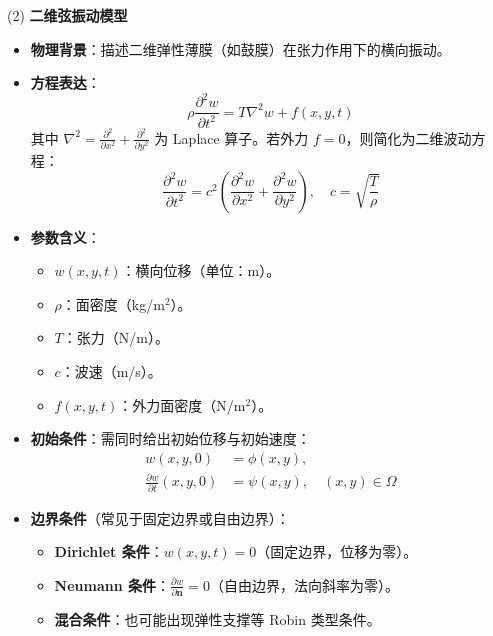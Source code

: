 \documentclass[UTF8]{article}
\begin{document}
(2) \textbf{二维弦振动模型}

\begin{itemize}[leftmargin=1.5em]
    \item \textbf{物理背景}：描述二维弹性薄膜（如鼓膜）在张力作用下的横向振动。
    \item \textbf{方程表达}：
    \begin{equation}
        \rho \frac{\partial^2 w}{\partial t^2} = T \nabla^2 w + f(x,y,t)
    \end{equation}
    其中 $\nabla^2 = \frac{\partial^2}{\partial x^2} + \frac{\partial^2}{\partial y^2}$ 为 Laplace 算子。若外力 $f=0$，则简化为二维波动方程：
    \begin{equation}
        \frac{\partial^2 w}{\partial t^2} = c^2 \left( \frac{\partial^2 w}{\partial x^2} + \frac{\partial^2 w}{\partial y^2} \right), \quad c = \sqrt{\frac{T}{\rho}}
    \end{equation}
    \item \textbf{参数含义}：
    \begin{itemize}
        \item $w(x,y,t)$：横向位移（单位：m）。
        \item $\rho$：面密度（kg/m$^2$）。
        \item $T$：张力（N/m）。
        \item $c$：波速（m/s）。
        \item $f(x,y,t)$：外力面密度（N/m$^2$）。
    \end{itemize}
    \item \textbf{初始条件}：需同时给出初始位移与初始速度：
    \begin{align}
        w(x,y,0) &= \phi(x,y), \\
        \frac{\partial w}{\partial t}(x,y,0) &= \psi(x,y), \quad (x,y) \in \Omega
    \end{align}
    \item \textbf{边界条件}（常见于固定边界或自由边界）：
    \begin{itemize}
        \item \textbf{Dirichlet 条件}：$w(x,y,t) = 0$（固定边界，位移为零）。
        \item \textbf{Neumann 条件}：$\frac{\partial w}{\partial \mathbf{n}} = 0$（自由边界，法向斜率为零）。
        \item \textbf{混合条件}：也可能出现弹性支撑等 Robin 类型条件。
    \end{itemize}
\end{itemize}
\end{document}

